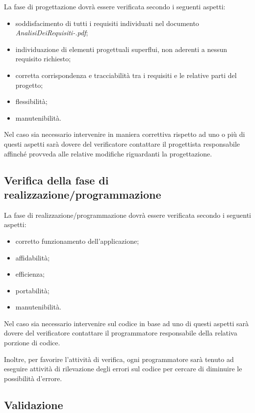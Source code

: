 La fase di progettazione dovr\`a essere verificata secondo i seguenti aspetti:

\begin{itemize}

\item soddisfacimento di tutti i requisiti individuati nel documento
\emph{AnalisiDeiRequisiti-\versioneAR.pdf};
\item individuazione di elementi progettuali superflui, non aderenti a nessun
requisito richiesto;
\item corretta corrispondenza e tracciabilit\`a tra i requisiti e le relative
parti del progetto;
\item flessibilit\`a;
\item manutenibilit\`a.

\end{itemize}

Nel caso sia necessario intervenire in maniera correttiva rispetto ad uno o
pi\`u di questi aspetti sar\`a dovere del verificatore contattare il progettista
responsabile affinch\'e provveda alle relative modifiche riguardanti la progettazione.

\subsection{Verifica della fase di realizzazione/programmazione}

La fase di realizzazione/programmazione dovr\`a essere verificata secondo i seguenti aspetti:
\begin{itemize}
\item corretto funzionamento dell'applicazione;
\item affidabilit\`a;
\item efficienza;
\item portabilit\`a;
\item manutenibilit\`a.

\end{itemize}

Nel caso sia necessario intervenire sul codice in base ad uno di questi aspetti
sar\`a dovere del verificatore contattare il programmatore responsabile della
relativa porzione di codice.

Inoltre, per favorire l'attivit\`a di verifica, ogni programmatore sar\`a tenuto
ad eseguire attivit\`a di rilevazione degli errori sul codice per cercare di
diminuire le possibilit\`a d'errore.

\subsection{Validazione}

